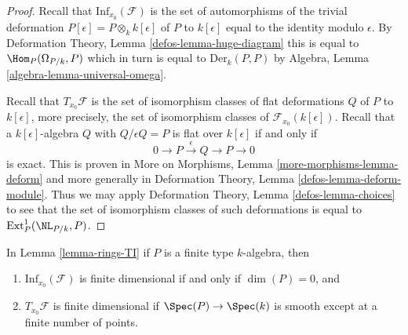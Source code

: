 \begin{proof}
Recall that $\text{Inf}_{x_0}(\mathcal{F})$ is the set of
automorphisms of the trivial deformation
$P[\epsilon] = P \otimes_k k[\epsilon]$ of $P$ to $k[\epsilon]$
equal to the identity modulo $\epsilon$.
By Deformation Theory, Lemma \ref{defos-lemma-huge-diagram}
this is equal to $\Hom_P(\Omega_{P/k}, P)$ which in turn is
equal to $\text{Der}_k(P, P)$ by
Algebra, Lemma \ref{algebra-lemma-universal-omega}.

\medskip\noindent
Recall that $T_{x_0}\mathcal{F}$ is the set of isomorphism classes
of flat deformations $Q$ of $P$ to $k[\epsilon]$, more precisely,
the set of isomorphism classes of $\mathcal{F}_{x_0}(k[\epsilon])$.
Recall that a $k[\epsilon]$-algebra $Q$ with $Q/\epsilon Q = P$
is flat over $k[\epsilon]$ if and only if
$$
0 \to P \xrightarrow{\epsilon} Q \to P \to 0
$$
is exact. This is proven in More on Morphisms, Lemma
\ref{more-morphisms-lemma-deform} and more generally in
Deformation Theory, Lemma \ref{defos-lemma-deform-module}.
Thus we may apply
Deformation Theory, Lemma \ref{defos-lemma-choices}
to see that the set of isomorphism classes of such
deformations is equal to $\text{Ext}^1_P(\NL_{P/k}, P)$.
\end{proof}

\begin{lemma}
\label{lemma-finite-type-rings-TI}
In Lemma \ref{lemma-rings-TI} if $P$ is a finite type $k$-algebra, then
\begin{enumerate}
\item $\text{Inf}_{x_0}(\mathcal{F})$ is finite dimensional if and only if
$\dim(P) = 0$, and
\item $T_{x_0}\mathcal{F}$ is finite dimensional if
$\Spec(P) \to \Spec(k)$ is smooth except at a finite number of points.
\end{enumerate}
\end{lemma}

